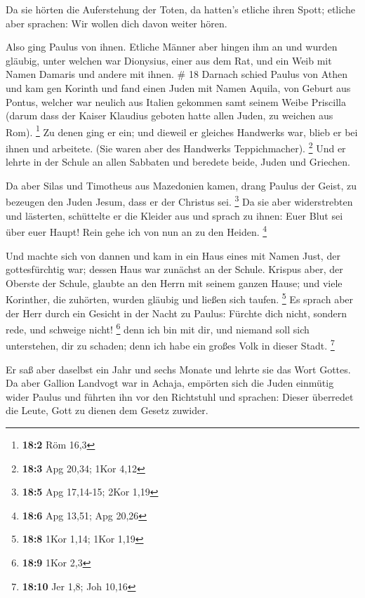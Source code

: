  Da sie hörten die Auferstehung der Toten, da hatten's
etliche ihren Spott; etliche aber sprachen: Wir wollen dich davon weiter
hören.

 Also ging Paulus von ihnen.  Etliche Männer
aber hingen ihm an und wurden gläubig, unter welchen war Dionysius,
einer aus dem Rat, und ein Weib mit Namen Damaris und andere mit ihnen.
\# 18  Darnach schied Paulus von Athen und kam gen Korinth
 und fand einen Juden mit Namen Aquila, von Geburt aus
Pontus, welcher war neulich aus Italien gekommen samt seinem Weibe
Priscilla (darum dass der Kaiser Klaudius geboten hatte allen Juden, zu
weichen aus Rom). \footnote{\textbf{18:2} Röm 16,3}  Zu
denen ging er ein; und dieweil er gleiches Handwerks war, blieb er bei
ihnen und arbeitete. (Sie waren aber des Handwerks Teppichmacher).
\footnote{\textbf{18:3} Apg 20,34; 1Kor 4,12}  Und er lehrte
in der Schule an allen Sabbaten und beredete beide, Juden und Griechen.

 Da aber Silas und Timotheus aus Mazedonien kamen, drang
Paulus der Geist, zu bezeugen den Juden Jesum, dass er der Christus sei.
\footnote{\textbf{18:5} Apg 17,14-15; 2Kor 1,19}  Da sie
aber widerstrebten und lästerten, schüttelte er die Kleider aus und
sprach zu ihnen: Euer Blut sei über euer Haupt! Rein gehe ich von nun an
zu den Heiden. \footnote{\textbf{18:6} Apg 13,51; Apg 20,26}

 Und machte sich von dannen und kam in ein Haus eines mit
Namen Just, der gottesfürchtig war; dessen Haus war zunächst an der
Schule.  Krispus aber, der Oberste der Schule, glaubte an
den Herrn mit seinem ganzen Hause; und viele Korinther, die zuhörten,
wurden gläubig und ließen sich taufen. \footnote{\textbf{18:8} 1Kor
  1,14; 1Kor 1,19}  Es sprach aber der Herr durch ein
Gesicht in der Nacht zu Paulus: Fürchte dich nicht, sondern rede, und
schweige nicht! \footnote{\textbf{18:9} 1Kor 2,3}  denn ich
bin mit dir, und niemand soll sich unterstehen, dir zu schaden; denn ich
habe ein großes Volk in dieser Stadt. \footnote{\textbf{18:10} Jer 1,8;
  Joh 10,16}

 Er saß aber daselbst ein Jahr und sechs Monate und lehrte
sie das Wort Gottes.  Da aber Gallion Landvogt war in
Achaja, empörten sich die Juden einmütig wider Paulus und führten ihn
vor den Richtstuhl  und sprachen: Dieser überredet die
Leute, Gott zu dienen dem Gesetz zuwider.

